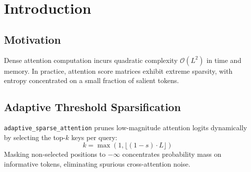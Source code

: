 \section{Introduction}

\subsection{Motivation}
Dense attention computation incurs quadratic complexity $\mathcal{O}(L^2)$ in time and memory. In practice, attention score matrices exhibit extreme sparsity, with entropy concentrated on a small fraction of salient tokens.

\subsection{Adaptive Threshold Sparsification}
\texttt{adaptive\_sparse\_attention} prunes low-magnitude attention logits dynamically by selecting the top-$k$ keys per query:
\[
k = \max\left(1, \lfloor (1 - s) \cdot L \rfloor\right)
\]
Masking non-selected positions to $-\infty$ concentrates probability mass on informative tokens, eliminating spurious cross-attention noise.
